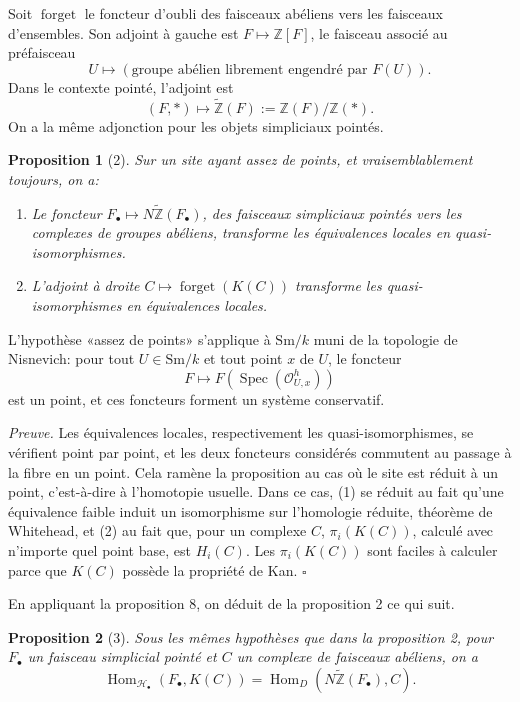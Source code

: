 \documentclass[11pt]{article}
\newcommand{\Z}{\mathbb Z}
\newcommand{\Sm}{\mathrm{Sm}}
\newcommand{\Spec}{\operatorname{Spec}}
\newcommand{\Hom}{\operatorname{Hom}}
\newcommand{\forget}{\operatorname{forget}}
\newcommand{\Hob}{\mathcal H_\bullet}
\newcommand{\pt}{*}
\newcommand{\ZZ}{\widetilde{\Z}}
\theoremstyle{deligne}
\newtheorem*{proposition*}{Proposition}
\newenvironment{proofdel}{\noindent\textit{Preuve.}}{\hfill$\square$}
\begin{document}
Soit \(\forget\) le foncteur d'oubli des faisceaux abéliens vers les faisceaux d'ensembles. Son adjoint à gauche est \(F\mapsto \Z[F]\), le faisceau associé au préfaisceau
\[
  U\longmapsto (\text{groupe abélien librement engendré par }F(U)).
\]
Dans le contexte pointé, l'adjoint est
\[
  (F,\pt)\longmapsto \ZZ(F):=\Z(F)/\Z(\pt).
\]
On a la même adjonction pour les objets simpliciaux pointés.

\begin{proposition*}[2]
Sur un site ayant assez de points, et vraisemblablement toujours, on a:
\begin{enumerate}[label=(\arabic*)]
\item Le foncteur \(F_\bullet\mapsto N\ZZ(F_\bullet)\), des faisceaux simpliciaux pointés vers les complexes de groupes abéliens, transforme les équivalences locales en quasi-isomorphismes.
\item L'adjoint à droite \(C\mapsto \forget(K(C))\) transforme les quasi-isomorphismes en équivalences locales.
\end{enumerate}
\end{proposition*}

L'hypothèse «assez de points» s'applique à \(\Sm/k\) muni de la topologie de Nisnevich: pour tout \(U\in\Sm/k\) et tout point \(x\) de \(U\), le foncteur
\[
  F\longmapsto F(\Spec(\mathcal O^h_{U,x}))
\]
est un point, et ces foncteurs forment un système conservatif.

\begin{proofdel}
Les équivalences locales, respectivement les quasi-isomorphismes, se vérifient point par point, et les deux foncteurs considérés commutent au passage à la fibre en un point. Cela ramène la proposition au cas où le site est réduit à un point, c'est-à-dire à l'homotopie usuelle. Dans ce cas, (1) se réduit au fait qu'une équivalence faible induit un isomorphisme sur l'homologie réduite, théorème de Whitehead, et (2) au fait que, pour un complexe \(C\), \(\pi_i(K(C))\), calculé avec n'importe quel point base, est \(H_i(C)\). Les \(\pi_i(K(C))\) sont faciles à calculer parce que \(K(C)\) possède la propriété de Kan.
\end{proofdel}

En appliquant la proposition 8, on déduit de la proposition 2 ce qui suit.

\begin{proposition*}[3]
Sous les mêmes hypothèses que dans la proposition 2, pour \(F_\bullet\) un faisceau simplicial pointé et \(C\) un complexe de faisceaux abéliens, on a
\[
  \Hom_{\Hob}(F_\bullet,K(C))=\Hom_D(N\ZZ(F_\bullet),C). \tag{3.1}
\]
\end{proposition*}
\end{document}
